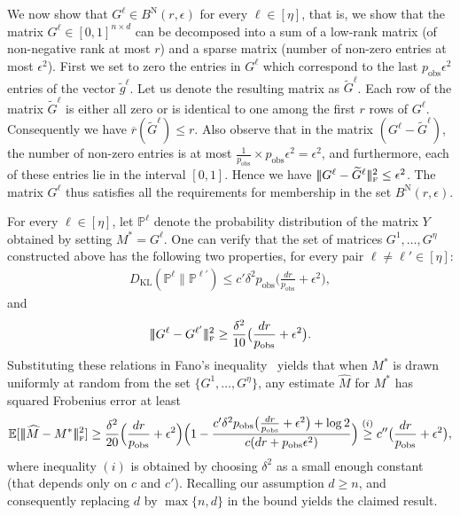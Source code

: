 \documentclass[11pt, hidelinks]{article} %
\newcommand{\matsnorm}[2]{|\!|\!| #1 | \! | \!|_{{#2}}}
\newcommand{\frobnorm}[1]{\ensuremath{\matsnorm{#1}{\mbox{\tiny{F}}}}}
\newcommand{\Exs}{\ensuremath{\mathbb{E}}}
\newcommand{\kl}[2]{\ensuremath{D_{\mathrm{KL}}(#1\|#2)}}
\newcommand{\mprob}{\ensuremath{\mathbb{P}}}
\newcommand{\numrows}{n}
\newcommand{\numcols}{d}
\newcommand{\plaincon}{c}
\newcommand{\wtmatrix}{M}
\newcommand{\wtstar}{\wtmatrix^*}
\newcommand{\wthat}{\widehat{\wtmatrix}}
\newcommand{\pp}{\ensuremath{p_{\mathrm{obs}}}}
\newcommand{\obs}{\ensuremath{Y}}
\newcommand{\nnrank}{r}
\newcommand{\fnnnrank}[1]{\overline{\nnrank}(#1)}
\newcommand{\oracleeps}{\epsilon}
\newcommand{\frobballnn}[2]{B^{\text{N}}(#1, #2)}
\newcommand{\packnum}{\ensuremath{\eta}}
\newcommand{\packvec}{g}
\newcommand{\packmat}{G}
\begin{document}
We now show that $\packmat^\ell \in \frobballnn{\nnrank}{\oracleeps}$ for every $\ell \in [\packnum]$, that is, we show that the matrix $\packmat^\ell \in [0,1]^{\numrows \times \numcols}$ can be decomposed into a sum of a low-rank matrix (of non-negative rank at most $\nnrank$) and a sparse matrix (number of non-zero entries at most $\oracleeps^2$). First we set to zero the entries in $\packmat^\ell$ which correspond to the last $\pp \epsilon^2$ entries of the vector $\widetilde{\packvec}^\ell$. Let us denote the resulting matrix as $\widetilde{\packmat}^\ell$. Each row of the matrix $\widetilde{\packmat}^\ell$ is either all zero or is identical to one among the first $\nnrank$ rows of $\packmat^\ell$. Consequently we have $\fnnnrank{\widetilde{\packmat}^\ell} \leq \nnrank$. Also observe that in the matrix $(\packmat^\ell - \widetilde{\packmat}^\ell)$, the number of non-zero entries is at most $\frac{1}{\pp} \times \pp \epsilon^2 = \epsilon^2$, and furthermore, each of these entries lie in the interval $[0,1]$. Hence we have $\frobnorm{\packmat^\ell - \widetilde{\packmat}^\ell}^2 \leq \epsilon^2$. The matrix $\packmat^\ell$ thus satisfies all the requirements for membership in the set $\frobballnn{\nnrank}{\oracleeps}$.

For every $\ell \in [\packnum]$, let $\mprob^\ell$ denote the probability distribution of the matrix $\obs$ obtained by setting $\wtstar = \packmat^\ell$. One can verify that the set of matrices $\packmat^1,\ldots,\packmat^\packnum$ constructed above has the following two properties, for every pair $\ell \neq \ell' \in [\packnum]$:
\begin{align*}
\kl{\mprob^\ell}{\mprob^{\ell'}} \leq \plaincon' \delta^2 \pp \big( \frac{\numcols \nnrank}{\pp} + \oracleeps^2 \big),
\end{align*}
and
\begin{align*}
\frobnorm{\packmat^\ell - \packmat^{\ell'}}^2 \geq  \frac{\delta^2}{10} \big( \frac{\numcols \nnrank}{\pp} + \oracleeps^2 \big).
\end{align*}
%
Substituting these relations in Fano's
inequality~\cite{cover2012elements} yields that when $\wtstar$ is
drawn uniformly at random from the set
$\{\packmat^1,\ldots,\packmat^\packnum\}$, any estimate $\wthat$ for
$\wtstar$ has squared Frobenius error at least
\begin{align*}
\Exs[ \frobnorm{\wthat - \wtstar}^2] \geq \frac{\delta^2}{20} \Big(
\frac{\numcols \nnrank}{\pp} + \oracleeps^2 \Big) \Big( 1 - \frac{
  \plaincon' \delta^2 \pp \big( \frac{\numcols \nnrank}{\pp} +
  \oracleeps^2 \big) + \log 2}{ \plaincon (\numcols \nnrank + \pp
  \oracleeps^2) } \Big) \stackrel{(i)}{\geq} \plaincon'' \big(
\frac{\numcols \nnrank}{\pp} + \oracleeps^2 \big),
\end{align*}
where inequality $(i)$ is obtained by choosing $\delta^2$ as a small enough constant (that depends only on $\plaincon$ and $\plaincon'$). Recalling our assumption $\numcols \geq \numrows$, and consequently replacing $\numcols$ by $\max\{\numrows, \numcols\}$ in the bound yields the claimed result.
\end{document}
